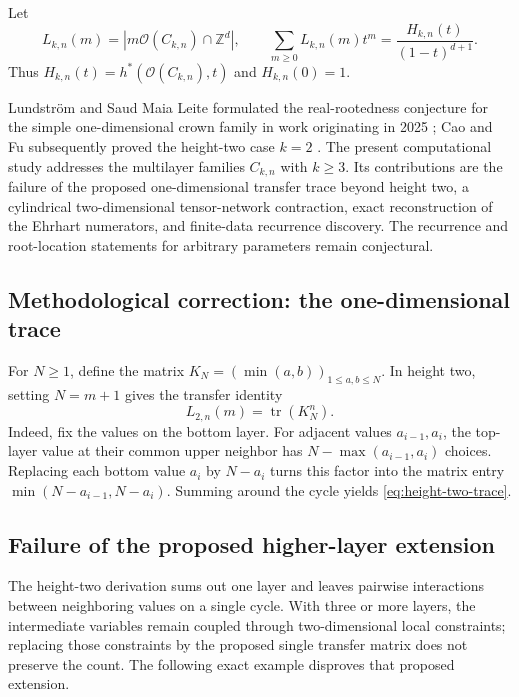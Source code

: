 \documentclass[11pt,a4paper]{article}
\theoremstyle{definition}
\begin{document}
Let
\begin{equation}
L_{k,n}(m)=|m\mathcal{O}(C_{k,n})\cap\mathbb{Z}^{d}|,
\qquad
\sum_{m\ge0}L_{k,n}(m)t^m=\frac{H_{k,n}(t)}{(1-t)^{d+1}}.
\end{equation}
Thus $H_{k,n}(t)=h^*(\mathcal{O}(C_{k,n}),t)$ and $H_{k,n}(0)=1$.

Lundström and Saud Maia Leite formulated the real-rootedness conjecture
for the simple one-dimensional crown family in work originating in 2025
\cite{LundstromLeite2026}; Cao and Fu subsequently proved the height-two
case $k=2$ \cite{CaoFu2026}. The present computational study addresses the
multilayer families $C_{k,n}$ with $k\ge3$. Its contributions are the
failure of the proposed one-dimensional transfer trace beyond height two,
a cylindrical two-dimensional tensor-network contraction, exact
reconstruction of the Ehrhart numerators, and finite-data recurrence
discovery. The recurrence and root-location statements for arbitrary
parameters remain conjectural.

\subsection{Methodological correction: the one-dimensional trace}

For $N\ge1$, define the matrix $K_N=(\min(a,b))_{1\le a,b\le N}$. In height two, setting $N=m+1$ gives the transfer identity
\begin{equation}\label{eq:height-two-trace}
L_{2,n}(m)=\operatorname{tr}(K_N^n).
\end{equation}
Indeed, fix the values on the bottom layer. For adjacent values $a_{i-1},a_i$, the top-layer value at their common upper neighbor has $N-\max(a_{i-1},a_i)$ choices. Replacing each bottom value $a_i$ by $N-a_i$ turns this factor into the matrix entry $\min(N-a_{i-1},N-a_i)$. Summing around the cycle yields \eqref{eq:height-two-trace}.

\subsection{Failure of the proposed higher-layer extension}

The height-two derivation sums out one layer and leaves pairwise interactions between neighboring values on a single cycle. With three or more layers, the intermediate variables remain coupled through two-dimensional local constraints; replacing those constraints by the proposed single transfer matrix does not preserve the count. The following exact example disproves that proposed extension.
\end{document}
